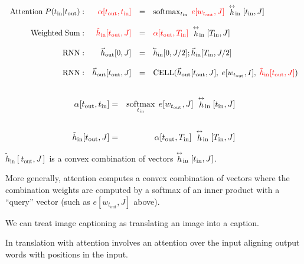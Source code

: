 {{
$$\begin{array}{rrcl}
  \mathrm{Attention}\;P(t_{\mathrm{in}}|t_{\mathrm{out}}): & {\color{red} \alpha[t_\mathrm{out},t_{\mathrm{in}}]} & =& \softmax_{t_\mathrm{in}} \;{\color{red} e[w_{t_\mathrm{out}},J]}\;\dvec{h}_\mathrm{in}[t_{\mathrm{in}},J] \\
   \\
     \mathrm{Weighted\; Sum:} & {\color{red} \tilde{h}_\mathrm{in}[t_\mathrm{out},J]} & = & {\color{red} \alpha[t_\mathrm{out},T_{\mathrm{in}}]}\;\dvec{h}_\mathrm{in}[T_{\mathrm{in}},J] \\
  \\
   \mathrm{RNN:} &\vec{h}_\mathrm{out}[0,J] & = & \cev{h}_\mathrm{in}[0,J/2];\vec{h}_\mathrm{in}[T_\mathrm{in},J/2] \\
   \\
  \mathrm{RNN:} & \vec{h}_\mathrm{out}[t_\mathrm{out},J] & = & \mathrm{CELL}(\vec{h}_\mathrm{out}[t_{\mathrm{out}},J],\;e[w_{t_\mathrm{out}},I],\;{\color{red} \tilde{h}_\mathrm{in}[t_\mathrm{out},J]}) \\
  \\


  \end{array}$$
}

\begin{eqnarray*}
  \alpha[t_\mathrm{out},t_{\mathrm{in}}]& =& \operatorname*{softmax}_{t_\mathrm{in}} \;e[w_{t_\mathrm{out}},J]\;\stackrel{\leftrightarrow}{h}_\mathrm{in}[t_{\mathrm{in}},J] \\
\\
\tilde{h}_\mathrm{in}[t_\mathrm{out},J]& = & \alpha[t_\mathrm{out},T_{\mathrm{in}}]\;\stackrel{\leftrightarrow}{h}_\mathrm{in}[T_{\mathrm{in}},J]
\end{eqnarray*}

\vfill
$\tilde{h}_\mathrm{in}[t_\mathrm{out},J]$ is a convex combination of vectors $\stackrel{\leftrightarrow}{h}_{\mathrm{in}}[t_{\mathrm{in}},J]$.

\vfill
More generally, attention computes a convex combination of vectors where the combination weights are computed by a softmax of an inner product with a ``query'' vector (such as $e[w_{t_{\mathrm{out}}},J]$ above).

We can treat image captioning as translating an image into a caption.

\vfill
In translation with attention involves an attention over the input aligning output words with positions in the input.

}
